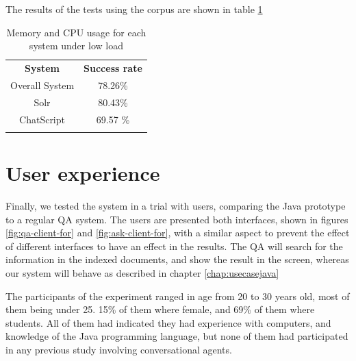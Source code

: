 The results of the tests using the corpus are shown in table \ref{tab:corpusresults}

\begin{table}
  \centering
  \begin{tabular*}{0.5\textwidth}{| c | c |}
    \hhline{|-|-|}
    \textbf{System} & \textbf{Success rate} \\ \hhline{|=|=|} 
    Overall System & 78.26\% \\ \hhline{|-|-|} 
    Solr & 80.43\% \\ \hhline{|-|-|} 
    ChatScript & 69.57 \% \\ \hhline{|-|-|} 
    \end{tabular*}
  \caption{Memory and CPU usage for each system under low load}
  \label{tab:corpusresults}
\end{table}

\section{User experience}

Finally, we tested the system in a trial with users, comparing the Java prototype to a regular \ac{QA} system. The users are presented both interfaces, shown in figures \ref{fig:qa-client-for} and \ref{fig:ask-client-for}, with a similar aspect to prevent the effect of different interfaces to have an effect in the results. The \ac{QA} will search for the information in the indexed documents, and show the result in the screen, whereas our system will behave as described in chapter \ref{chap:usecasejava}

The participants of the experiment ranged in age from 20 to 30 years old, most of them being under 25. 15\% of them where female, and 69\% of them where students. All of them had indicated they had experience with computers, and knowledge of the Java programming language, but none of them had participated in any previous study involving conversational agents.

